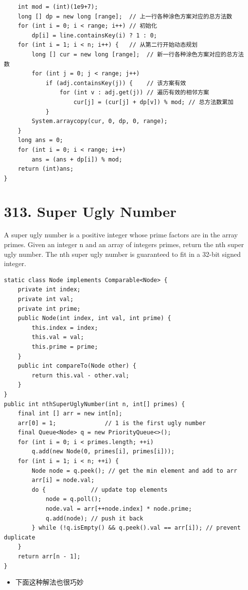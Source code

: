 \documentclass[9pt, b5paaper]{book}
\begin{document}
\begin{verbatim}
    int mod = (int)(1e9+7);
    long [] dp = new long [range];  // 上一行各种涂色方案对应的总方法数
    for (int i = 0; i < range; i++) // 初始化
        dp[i] = line.containsKey(i) ? 1 : 0;
    for (int i = 1; i < n; i++) {   // 从第二行开始动态规划
        long [] cur = new long [range];  // 新一行各种涂色方案对应的总方法数
        for (int j = 0; j < range; j++) 
            if (adj.containsKey(j)) {    // 该方案有效
                for (int v : adj.get(j)) // 遍历有效的相邻方案
                    cur[j] = (cur[j] + dp[v]) % mod; // 总方法数累加
            }
        System.arraycopy(cur, 0, dp, 0, range);
    }
    long ans = 0;
    for (int i = 0; i < range; i++) 
        ans = (ans + dp[i]) % mod;
    return (int)ans;
}
\end{verbatim}

\section{313. Super Ugly Number}
\label{sec-2-17}
A super ugly number is a positive integer whose prime factors are in the array primes.
Given an integer n and an array of integers primes, return the nth super ugly number.
The nth super ugly number is guaranteed to fit in a 32-bit signed integer.
\begin{verbatim}
static class Node implements Comparable<Node> {
    private int index;
    private int val;
    private int prime;
    public Node(int index, int val, int prime) {
        this.index = index;
        this.val = val;
        this.prime = prime;
    }
    public int compareTo(Node other) {
        return this.val - other.val;
    }
}
public int nthSuperUglyNumber(int n, int[] primes) {
    final int [] arr = new int[n];
    arr[0] = 1;              // 1 is the first ugly number
    final Queue<Node> q = new PriorityQueue<>();
    for (int i = 0; i < primes.length; ++i) 
        q.add(new Node(0, primes[i], primes[i]));
    for (int i = 1; i < n; ++i) {
        Node node = q.peek(); // get the min element and add to arr
        arr[i] = node.val;
        do {             // update top elements
            node = q.poll();
            node.val = arr[++node.index] * node.prime;
            q.add(node); // push it back
        } while (!q.isEmpty() && q.peek().val == arr[i]); // prevent duplicate
    }
    return arr[n - 1];
}
\end{verbatim}
\begin{itemize}
\item 下面这种解法也很巧妙
\end{itemize}
\end{document}

